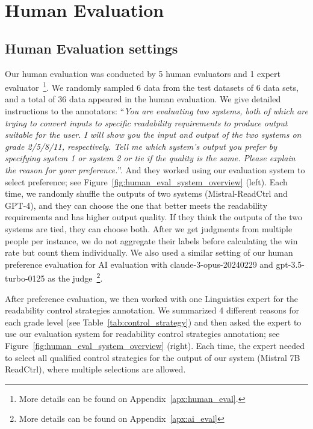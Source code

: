 \documentclass[11pt]{article}
\begin{document}
\section{Human Evaluation}
\label{Sec:human_eval}

\subsection{Human Evaluation settings}
Our human evaluation was conducted by 5 human evaluators and 1 expert evaluator~\footnote{More details can be found on Appendix~\ref{apx:human_eval}.}.
We randomly sampled 6 data from the test datasets of 6 data sets, and a total of 36 data appeared in the human evaluation.
We give detailed instructions to the annotators: ``\emph{You are evaluating two systems, both of which are trying to convert inputs to specific readability requirements to produce output suitable for the user. I will show you the input and output of the two systems on grade 2/5/8/11, respectively. Tell me which system's output you prefer by specifying system 1 or system 2 or tie if the quality is the same. Please explain the reason for your preference.}''. And they worked using our evaluation system to select preference; see Figure~\ref{fig:human_eval_system_overview} (left). 
Each time, we randomly shuffle the outputs of two systems (Mistral-ReadCtrl and GPT-4), and they can choose the one that better meets the readability requirements and has higher output quality. If they think the outputs of the two systems are tied, they can choose both.
After we get judgments from multiple people per instance, we do not aggregate their labels before calculating the win rate but count them individually.
We also used a similar setting of our human preference evaluation for AI evaluation with claude-3-opus-20240229 and gpt-3.5-turbo-0125 as the judge~\footnote{More details can be found on Appendix~\ref{apx:ai_eval}}.




After preference evaluation, we then worked with one Linguistics expert for the readability control strategies annotation.
We summarized 4 different reasons for each grade level (see Table~\ref{tab:control_strategy}) and then asked the expert to use our evaluation system for readability control strategies annotation; see Figure~\ref{fig:human_eval_system_overview} (right). 
Each time, the expert needed to select all qualified control strategies for the output of our system (Mistral 7B ReadCtrl), where multiple selections are allowed.
\end{document}
